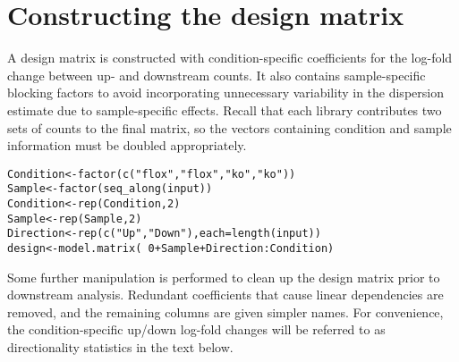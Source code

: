 \documentclass{report}\usepackage[]{graphicx}\usepackage[usenames,dvipsnames]{color}
\newcommand{\hlnum}[1]{\textcolor[rgb]{0.816,0.125,0.439}{#1}}%
\newcommand{\hlstr}[1]{\textcolor[rgb]{0.251,0.627,0.251}{#1}}%
\newcommand{\hlopt}[1]{\textcolor[rgb]{0,0,0}{#1}}%
\newcommand{\hlstd}[1]{\textcolor[rgb]{0.251,0.251,0.251}{#1}}%
\newcommand{\hlkwb}[1]{\textcolor[rgb]{0,0,0}{#1}}%
\newcommand{\hlkwc}[1]{\textcolor[rgb]{0.251,0.251,0.251}{#1}}%
\newcommand{\hlkwd}[1]{\textcolor[rgb]{0.878,0.439,0.125}{#1}}%
\newenvironment{knitrout}{}{} %
\begin{document}
\section{Constructing the design matrix}
A design matrix is constructed with condition-specific coefficients for the log-fold change between up- and downstream counts.
It also contains sample-specific blocking factors to avoid incorporating unnecessary variability in the dispersion estimate due to sample-specific effects.
Recall that each library contributes two sets of counts to the final matrix, so the vectors containing condition and sample information must be doubled appropriately.

\begin{knitrout}
\color{fgcolor}\begin{kframe}
\begin{alltt}
\hlstd{Condition} \hlkwb{<-} \hlkwd{factor}\hlstd{(}\hlkwd{c}\hlstd{(}\hlstr{"flox"}\hlstd{,} \hlstr{"flox"}\hlstd{,} \hlstr{"ko"}\hlstd{,} \hlstr{"ko"}\hlstd{))}
\hlstd{Sample} \hlkwb{<-} \hlkwd{factor}\hlstd{(}\hlkwd{seq_along}\hlstd{(input))}
\hlstd{Condition} \hlkwb{<-} \hlkwd{rep}\hlstd{(Condition,} \hlnum{2}\hlstd{)}
\hlstd{Sample} \hlkwb{<-} \hlkwd{rep}\hlstd{(Sample,} \hlnum{2}\hlstd{)}
\hlstd{Direction} \hlkwb{<-} \hlkwd{rep}\hlstd{(}\hlkwd{c}\hlstd{(}\hlstr{"Up"}\hlstd{,} \hlstr{"Down"}\hlstd{),} \hlkwc{each}\hlstd{=}\hlkwd{length}\hlstd{(input))}
\hlstd{design} \hlkwb{<-} \hlkwd{model.matrix}\hlstd{(}\hlopt{~}\hlnum{0} \hlopt{+} \hlstd{Sample} \hlopt{+} \hlstd{Direction}\hlopt{:}\hlstd{Condition)}
\end{alltt}
\end{kframe}
\end{knitrout}

Some further manipulation is performed to clean up the design matrix prior to downstream analysis.
Redundant coefficients that cause linear dependencies are removed, and the remaining columns are given simpler names.
For convenience, the condition-specific up/down log-fold changes will be referred to as directionality statistics in the text below.
\end{document}

